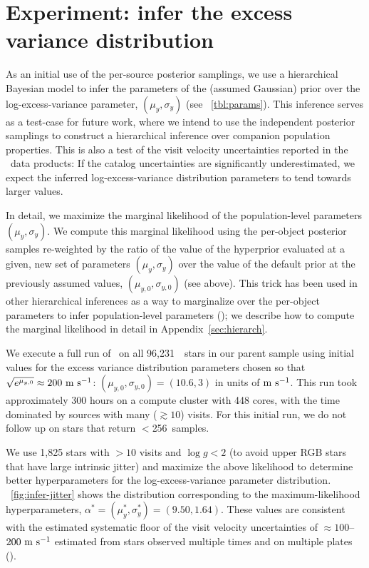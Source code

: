 \documentclass[modern, letterpaper]{aastex62}
\newcommand{\apogee}{\project{\acronym{APOGEE}}}
\newcommand{\thejoker}{\project{The~Joker}}
\newcommand{\nposterior}{256}
\newcommand{\nstars}{96,231}
\begin{document}
\section{Experiment: infer the excess variance distribution}
\label{sec:inferjitter}

As an initial use of the per-source posterior samplings, we use a hierarchical
Bayesian model to infer the parameters of the (assumed Gaussian) prior over the
log-excess-variance parameter, $(\mu_y, \sigma_y)$ (see
\tablename~\ref{tbl:params}).
This inference serves as a test-case for future work, where we intend to use the
independent posterior samplings to construct a hierarchical inference over
companion population properties.
This is also a test of the visit velocity uncertainties reported in the \apogee\
data products: If the catalog uncertainties are significantly underestimated, we
expect the inferred log-excess-variance distribution parameters to tend towards
larger values.

In detail, we maximize the marginal likelihood of the population-level
parameters $(\mu_y, \sigma_y)$.
We compute this marginal likelihood using the per-object posterior samples
re-weighted by the ratio of the value of the hyperprior evaluated at a given,
new set of parameters $(\mu_y, \sigma_y)$ over the value of the default prior at
the previously assumed values, $(\mu_{y,0}, \sigma_{y,0})$ (see above).
This trick has been used in other hierarchical inferences as a way to
marginalize over the per-object parameters to infer population-level parameters
(\citealt{Hogg:2010,Foreman-Mackey:2014}); we describe how to compute the
marginal likelihood in detail in Appendix~\ref{sec:hierarch}.

We execute a full run of \thejoker\ on all \nstars\ \apogee\ stars in our parent
sample using initial values for the excess variance distribution parameters
chosen so that $\sqrt{e^{\mu_{y,0}}} \approx 200~\mathrm{m}~\mathrm{s}^{-1}$: $(\mu_{y,0},
\sigma_{y,0}) = (10.6, 3)$ in units of $\mathrm{m}~\mathrm{s}^{-1}$.
This run took approximately 300 hours on a compute cluster with 448 cores, with
the time dominated by sources with many ($\gtrsim 10$) visits.  For this initial
run, we do not follow up on stars that return $<$\nposterior\ samples.

We use 1,825 stars with $>10$ visits and $\log g < 2$ (to avoid upper RGB stars
that have large intrinsic jitter) and maximize the above likelihood to determine
better hyperparameters for the log-excess-variance parameter distribution.
\figurename~\ref{fig:infer-jitter} shows the distribution corresponding to the
maximum-likelihood hyperparameters, $\alpha^* = (\mu_y^*, \sigma_y^*) = (9.50,
1.64)$.
These values are consistent with the estimated systematic floor of the visit
velocity uncertainties of $\approx 100$--$200~\mathrm{m}~\mathrm{s}^{-1}$ estimated from stars
observed multiple times and on multiple plates (\citealt{Nidever:2015}).
\end{document}
